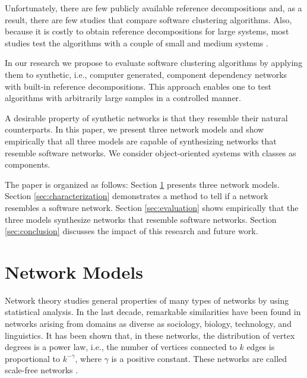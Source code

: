 Unfortunately, there are few publicly available reference decompositions
\cite{Koschke2000} and, as a result, there are few studies that compare software
clustering algorithms. Also, because it is costly to obtain reference
decompositions for large systems, most studies test the algorithms with a couple
of small and medium systems \cite{Anquetil1999,Maqbool2007,Bittencourt2009}.

In our research we propose to evaluate software clustering algorithms by
applying them to synthetic, i.e., computer generated, component dependency
networks with built-in reference decompositions. This approach enables one to
test algorithms with arbitrarily large samples in a controlled manner.

A desirable property of synthetic networks is that they resemble their natural
counterparts. In this paper, we present three network models and show
empirically that all three models are capable of synthesizing networks that
resemble software networks. We consider object-oriented systems with classes as
components.

The paper is organized as follows: Section \ref{sec:models} presents three
network models.
%
Section \ref{sec:characterization} demonstrates a method to tell if a network
resembles a software network.
%
Section \ref{sec:evaluation} shows empirically that the three models synthesize
networks that resemble software networks.
%
Section \ref{sec:conclusion} discusses the impact of this research and future
work.


\section{Network Models} \label{sec:models} 

Network theory studies general properties of many types of networks by using
statistical analysis. In the last decade, remarkable similarities have been
found in networks arising from domains as diverse as sociology, biology,
technology, and linguistics. It has been shown that, in these networks, the
distribution of vertex degrees is a power law, i.e., the number of vertices
connected to $k$ edges is proportional to $k^{-\gamma}$, where $\gamma$ is a
positive constant. These networks are called scale-free networks
\cite{Barabasi1999}.

